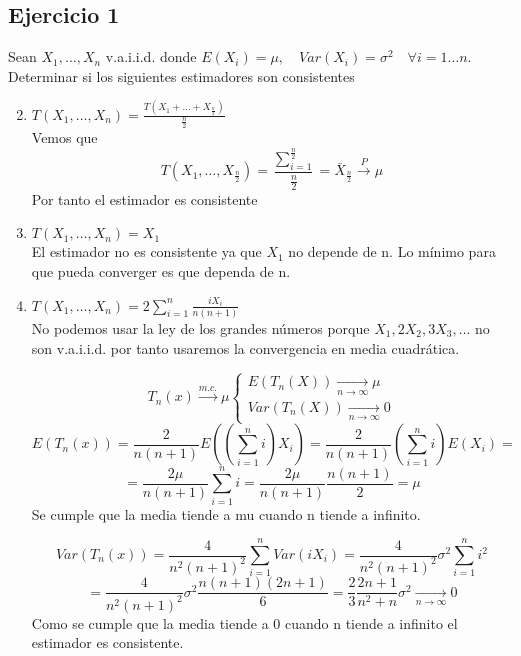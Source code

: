\subsection*{Ejercicio 1}

Sean $X_1, \dots, X_n$ v.a.i.i.d. donde $E(X_i)=\mu,\quad Var(X_i)=\sigma^2 \quad \forall i=1 \dots n$. Determinar si los siguientes estimadores son consistentes
\begin{enumerate}[label=\alph*)]\setcounter{enumi}{1}
    \item $T(X_1,\dots,X_n)=\frac{T(X_1 + \dots + X_{\frac{n}{2}})}{\frac{n}{2}}$\\
          Vemos que
          \[
              T(X_1,\dots,X_{\frac{n}{2}}) = \frac{\sum_{i=1}^{\frac{n}{2}}}{\frac{n}{2}} = \bar{X}_{\frac{n}{2}} \xrightarrow{P} \mu
          \]
          Por tanto el estimador es consistente

    \item $T(X_1,\dots,X_n)=X_1$\\
          El estimador no es consistente ya que $X_1$ no depende de n. Lo mínimo para que pueda converger es que dependa de n.

    \item $T(X_1,\dots,X_n)=2  \sum_{i=1}^{n}\frac{i  X_i}{n(n+1)}$\\
          No podemos usar la ley de los grandes números porque $X_1, 2X_2, 3X_3, \dots$ no son v.a.i.i.d. por tanto usaremos la convergencia en media cuadrática.

          \[
              T_n(x) \xrightarrow{m.c.} \mu
              \left\{
              \begin{array}{l}
                  E(T_n(X)) \xrightarrow[n \to \infty]{} \mu \\
                  Var(T_n(X)) \xrightarrow[n \to \infty]{} 0
              \end{array}
              \right.
          \]
          \[
              E(T_n(x))=\frac{2}{n  (n+1)}  E((\sum_{i=1}^{n} i)  X_i)=\frac{2}{n  (n+1)}  (\sum_{i=1}^{n} i)   E(X_i)=
          \]
          \[
              =\frac{2  \mu}{n  (n+1)}  \sum_{i=1}^{n} i=\frac{2  \mu}{n  (n+1)} \frac{n  (n+1)}{2}= \mu
          \]
          Se cumple que la media tiende a mu cuando n tiende a infinito.

          \[
              Var(T_n(x))=\frac{4}{n^2  (n+1)^2}  \sum_{i=1}^{n} Var(i X_i)= \frac{4}{n^2  (n+1)^2}  \sigma^2  \sum_{i=1}^{n} i^2
          \]
          \[
              =\frac{4}{n^2  (n+1)^2}  \sigma^2  \frac{n  (n+1)  (2n+1)}{6}=\frac{2}{3} \frac{2n+1}{n^2+n} \sigma^2 \xrightarrow[n \to \infty]{} 0
          \]
          Como se cumple que la media tiende a 0 cuando n tiende a infinito el estimador es consistente.
\end{enumerate}

